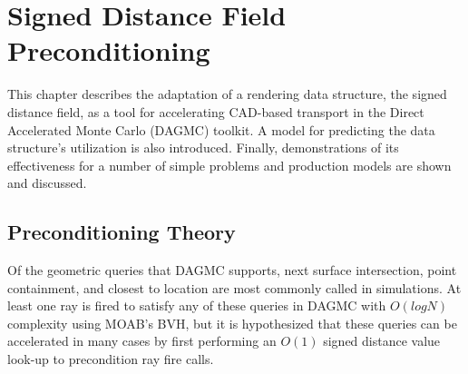 

\newcommand{\precondQuery}[4] {
  \null %
  \textbf{\uppercase{#1}} 
  \begin{adjustwidth}{1em}{0pt}
    \begin{figure}[H]
      \begin{center}
        {0.65\textwidth}
        \caption{#3}
        \label{fig:#2}
      \end{center}
    \end{figure}
    #4
  \end{adjustwidth}
}

\newcommand{\sdfModel}[2] {
  \null %
  \textbf{\uppercase{#1}} 
  \begin{adjustwidth}{2.5em}{0pt}
    #2
  \end{adjustwidth}
  \null
}

\chapter{Signed Distance Field Preconditioning}\label{ch:preconditioning}

This chapter describes the adaptation of a rendering data structure, the signed
distance field, as a tool for accelerating CAD-based transport in the Direct
Accelerated Monte Carlo (DAGMC) toolkit. A model for predicting the data
structure's utilization is also introduced. Finally, demonstrations of its
effectiveness for a number of simple problems and production models are shown
and discussed.

\section{Preconditioning Theory}\label{section:preconditioner_theory}

Of the geometric queries that DAGMC supports, next surface intersection, point
containment, and closest to location are most commonly called in simulations.
At least one ray is fired to satisfy any of these queries in DAGMC with
$O(logN)$ complexity using MOAB's BVH, but it is hypothesized that these queries
can be accelerated in many cases by first performing an $O(1)$ signed distance
value look-up to precondition ray fire calls.


